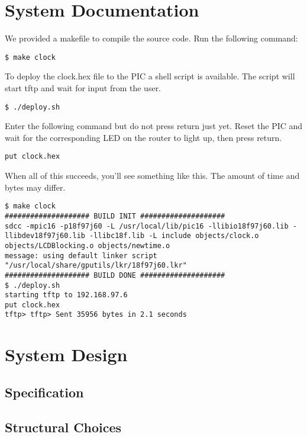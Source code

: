 \documentclass[11pt]{article}
\begin{document}
\section{System Documentation}
We provided a makefile to compile the source code. Run the following command:
\begin{lstlisting}
$ make clock 
\end{lstlisting}
To deploy the clock.hex file to the PIC a shell script is available. The script will start tftp and wait for input from the user. 
\begin{lstlisting}
$ ./deploy.sh 
\end{lstlisting}
Enter the following command but do not press return just yet. Reset the PIC and wait for the corresponding LED on the router to light up, then press return.
\begin{lstlisting}
put clock.hex
\end{lstlisting}
When all of this succeeds, you'll see something like this. The amount of time and bytes may differ.
\begin{lstlisting}
$ make clock 
#################### BUILD INIT ####################
sdcc -mpic16 -p18f97j60 -L /usr/local/lib/pic16 -llibio18f97j60.lib -llibdev18f97j60.lib -llibc18f.lib -L include objects/clock.o objects/LCDBlocking.o objects/newtime.o
message: using default linker script "/usr/local/share/gputils/lkr/18f97j60.lkr"
#################### BUILD DONE ####################
$ ./deploy.sh 
starting tftp to 192.168.97.6
put clock.hex
tftp> tftp> Sent 35956 bytes in 2.1 seconds
\end{lstlisting}

\section{System Design}

\subsection{Specification}

\subsection{Structural Choices}
\end{document}
